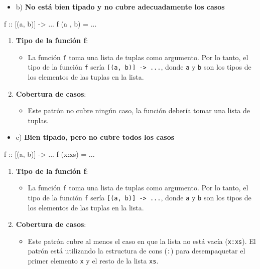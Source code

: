 \documentclass{article}
\begin{document}
\begin{itemize}
    \item 
    b) \textbf{No está bien tipado y no cubre adecuadamente los casos}
    \end{itemize}
    \begin{haskell}
    f :: [(a, b)] -> ...
    f (a , b) = ...
    \end{haskell}
    \begin{enumerate}
    \item 
    \textbf{Tipo de la función f}:
    \begin{itemize}
    \item 
    La función \verb|f| toma una lista de tuplas como argumento. Por lo tanto, el tipo de la función \verb|f| sería \verb|[(a, b)] -> ...|, donde \verb|a| y \verb|b| son los tipos de los elementos de las tuplas en la lista.
    \end{itemize}
    \item 
    \textbf{Cobertura de casos}:
    \begin{itemize}
    \item 
    Este patrón no cubre ningún caso, la función debería tomar una lista de tuplas.
    \end{itemize}
\end{enumerate}
    
\begin{itemize}
    \item 
    c) \textbf{Bien tipado, pero no cubre todos los casos}
    \end{itemize}
    \begin{haskell}
    f :: [(a, b)] -> ...
    f (x:xs) = ...
    \end{haskell}
    \begin{enumerate}
    \item 
    \textbf{Tipo de la función f}:
    \begin{itemize}
    \item 
    La función \verb|f| toma una lista de tuplas como argumento. Por lo tanto, el tipo de la función \verb|f| sería \verb|[(a, b)] -> ...|, donde \verb|a| y \verb|b| son los tipos de los elementos de las tuplas en la lista.
    \end{itemize}
    \item 
    \textbf{Cobertura de casos}:
    \begin{itemize}
    \item 
    Este patrón cubre al menos el caso en que la lista no está vacía (\verb|x:xs|). El patrón está utilizando la estructura de cons (\verb|:|) para desempaquetar el primer elemento \verb|x| y el resto de la lista \verb|xs|.
    \end{itemize}
    \end{enumerate}
    
\end{document}
